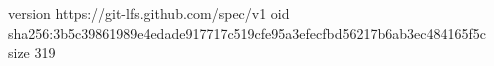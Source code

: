 version https://git-lfs.github.com/spec/v1
oid sha256:3b5c39861989e4edade917717c519cfe95a3efecfbd56217b6ab3ec484165f5c
size 319
